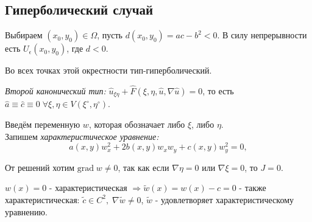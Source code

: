 \documentclass[../main.tex]{subfiles}
\begin{document}
\subsection{Гиперболический случай}

Выбираем $(x_0, y_0) \in \Omega$, пусть $d(x_0, y_0) = ac - b^2 < 0$. В силу непрерывности есть $U_\epsilon(x_0, y_0)$, где $d < 0$.



Во всех точках этой окрестности тип-гиперболический.

\begin{definition}
\textit{Второй канонический тип:} $\hat{u}_{\xi\eta} + \hat{F}(\xi, \eta, \hat{u}, \nabla \hat{u}) = 0$, то есть $\hat{a} \equiv \hat{c} \equiv 0\; \forall \xi, \eta \in V(\xi^{\circ}, \eta^{\circ})$.
\end{definition}
Введём переменную $w$, которая обозначает либо $\xi$, либо $\eta$.\\
Запишем \textit{характеристическое уравнение:}
\begin{equation*}
	a(x, y) w^{2}_x + 2b(x, y)w_x w_y + c(x, y)w_y^2  = 0, 
\end{equation*}

От решений хотим $\text{grad}\;w \neq 0$, так как если $\nabla \eta = 0$ или $\nabla \xi = 0$, то $J = 0$.

\begin{remark}
	$w(x) = 0$ - характеристическая $\Rightarrow \tilde{w}(x) =  w(x) - c = 0$ - также характеристическая: $\tilde{c} \in C^2,\; \nabla \tilde{w} \neq 0$, $\tilde{w}$ - удовлетворяет характеристическому уравнению.
\end{remark}
\end{document}

